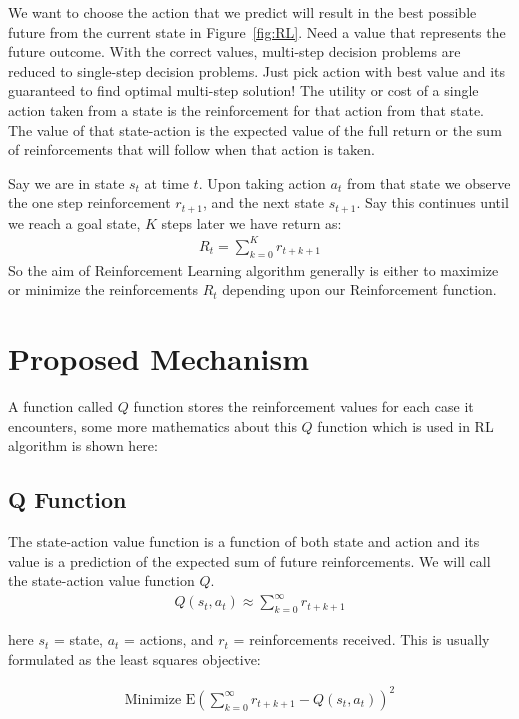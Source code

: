 \documentclass{article}
\begin{document}
We want to choose the action that we predict will result in the best possible future from the current state in Figure~\ref{fig:RL}. Need a value that represents the future outcome. With the correct values, multi-step decision problems are reduced to single-step decision problems. Just pick action with best value and its guaranteed to find optimal multi-step solution! The utility or cost of a single action taken from a state is the reinforcement for that action from that state. The value of that state-action is the expected value of the full return or the sum of reinforcements that will follow when that action is taken.\par
Say we are in state $s_t$ at time $t$. Upon taking action $a_t$ from that state we observe the one step reinforcement $r_{t+1}$, and the next state $s_{t+1}$. Say this continues until we reach a goal state, $K$ steps later we have return as:
 \begin{align*}
      R_t = \sum_{k=0}^K r_{t+k+1}
  \end{align*}
So the aim of Reinforcement Learning algorithm generally is either to maximize or minimize the reinforcements $R_t$ depending upon our Reinforcement function.
\section{Proposed Mechanism}
A function called $Q$ function stores the reinforcement values for each case it encounters, some more mathematics about this $Q$ function which is used in RL algorithm is shown here:
\subsection{Q Function}
The state-action value function is a function of both state and action and its value is a prediction of the expected sum of future reinforcements. We will call the state-action value function $Q$.
\begin{align*}
      Q(s_t,a_t) \approx \sum_{k=0}^\infty r_{t+k+1}
\end{align*}

here $s_t$ = state, $a_t$ = actions, and $r_t$ = reinforcements received.
This is usually formulated as the least squares objective:


    \begin{align*}
      \text{Minimize } \mathrm{E} \left ( \sum_{k=0}^\infty r_{t+k+1} - Q(s_t,a_t)\right )^2
    \end{align*}
    
\end{document}
